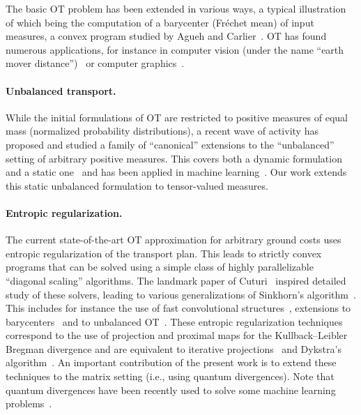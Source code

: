 The basic OT problem has been extended in various ways, a typical illustration of which being the computation of a barycenter (Fr\'echet mean) of input measures, a convex program studied by Agueh and Carlier~.
%
OT has found numerous applications, for instance in computer vision (under the name ``earth mover distance'')~\cite{rubner-2000} or computer graphics~\cite{bonneel-2011}. %


\paragraph{Unbalanced transport.}

While the initial formulations of OT are restricted to positive measures of equal mass (normalized probability distributions), a recent wave of activity has proposed and studied a family of ``canonical'' extensions %
to the ``unbalanced'' setting of arbitrary positive measures. This covers both a dynamic formulation~\cite{LieroMielkeSavareCourt,kondratyev2015,2016-chizat-focm} and a static one~\cite{LieroMielkeSavareLong,2015-chizat-unbalanced} and has been applied in machine learning~\cite{frogner-2015}. 
%
Our work extends this static unbalanced formulation to tensor-valued measures. 


\paragraph{Entropic regularization.}

The current state-of-the-art OT approximation for arbitrary ground costs uses entropic regularization of the transport plan. This leads to strictly convex programs that can be solved using a simple class of highly parallelizable ``diagonal scaling'' algorithms. The landmark paper of Cuturi~ inspired detailed study of these solvers, leading to various generalizations of Sinkhorn's algorithm~. This includes for instance the use of fast convolutional structures~\cite{solomon-2015}, extensions to barycenters~\cite{benamou-2015} and to unbalanced OT~\cite{frogner-2015,2016-chizat-sinkhorn}.
%
These entropic regularization techniques correspond to the use of projection and proximal maps for the Kullback--Leibler Bregman divergence and are equivalent to iterative projections~\cite{bregman-1967} and Dykstra's algorithm~\cite{Dykstra83,bauschke-lewis}. 
%
An important contribution of the present work is to extend these techniques to the matrix setting (i.e., using quantum divergences). Note that quantum divergences have been recently used to solve some machine learning problems~\cite{Dhillon2008,Kulis2009,Chandrasekaran2016}.%


